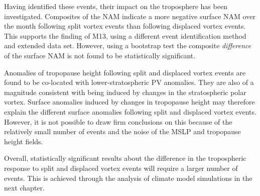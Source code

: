 Having identified these events, their impact on the troposphere has been
investigated. Composites of the NAM indicate a more negative surface NAM over
the month following split vortex events than following displaced vortex
events. This supports the finding of M13, using a different event identification
method and extended data set. However, using a bootstrap test the composite
\emph{difference} of the surface NAM is not found to be statistically
significant.

Anomalies of tropopause height following split and displaced vortex events are
found to be co-located with lower-stratospheric PV anomalies. They are also of a
magnitude consistent with being induced by changes in the stratospheric polar
vortex. Surface anomalies induced by changes in tropopause height may therefore
explain the different surface anomalies following split and displaced vortex
events. However, it is not possible to draw firm conclusions on this because of
the relatively small number of events and the noise of the MSLP and tropopause
height fields.

Overall, statistically significant results about the difference in the
tropospheric response to split and displaced vortex events will require a larger
number of events. This is achieved through the analysis of climate model
simulations in the next chapter.  












